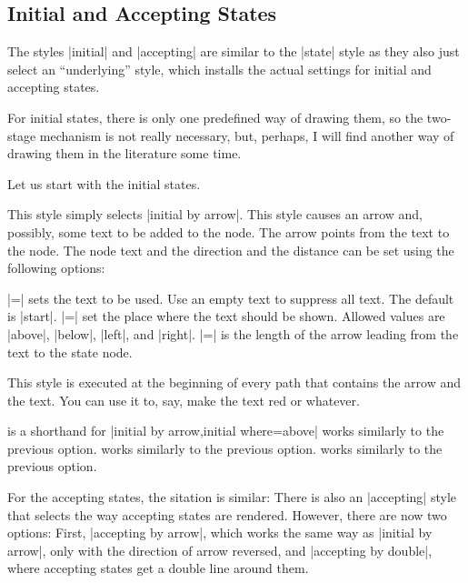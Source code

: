 \subsection{Initial and Accepting States}

The styles |initial| and |accepting| are similar to the |state| style
as they also just select an ``underlying'' style, which installs the
actual settings for initial and accepting states.

For initial states, there is only one predefined way of drawing them,
so the two-stage mechanism is not really necessary, but, perhaps,
I will find another way of drawing them in the literature some time.

Let us start with the initial states.
\begin{itemize}
  This style simply selects |initial by arrow|.
  This style causes an arrow and, possibly, some text to be added to
  the node. The arrow points from the text to the node. The node text
  and the direction and the distance can be set using the following
  options:
  \begin{itemize}
  |=| sets the text to be
  used. Use an empty text to suppress all text. The default is
  |start|. 
  |=| set the place where
  the text should be shown. Allowed values are |above|, |below|,
  |left|, and |right|.
  |=| is the length of the
  arrow leading from the text to the state node.
  \end{itemize}
  This style is executed at the beginning of every path that contains
  the arrow and the text. You can use it to, say, make the text red or
  whatever. 
\begin{codeexample}[]
\end{codeexample}
   is a shorthand for
  |initial by arrow,initial where=above|
   works similarly to the previous option.
   works similarly to the previous option.
   works similarly to the previous option.
\end{itemize}

For the accepting states, the sitation is similar: There is also an
|accepting| style that selects the way accepting states are
rendered. However, there are now two options: First,
|accepting by arrow|, which works the same way as |initial by arrow|,
only with the direction of arrow reversed, and |accepting by double|,
where accepting states get a double line around them.

